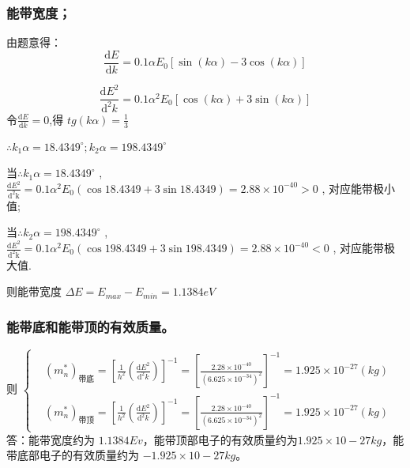 \documentclass[UTF8]{ctexart}   %
\begin{document}
\subsubsection{能带宽度；}

由题意得：
\begin{equation}
    \frac{\mathrm{d}E}{\mathrm{d}k} = 0.1 \alpha E_{0}[ \sin( k \alpha ) -3 \cos( k \alpha ) ]
\end{equation}

\begin{equation}
    \frac{\mathrm{d}E^{2}}{\mathrm{d^{2}}k} = 0.1 \alpha ^{2} E_{0} [ \cos( k \alpha ) + 3 \sin( k \alpha ) ]
\end{equation}
令$ \frac{\mathrm{d} E }{\mathrm{d} k } = 0 $,得 $ tg (k\alpha)= \frac{1}{3} $

$ \therefore k_{1} \alpha = 18.4349 ^{\circ} ; k_{2} \alpha = 198.4349 ^{\circ} $

当$ \therefore k_{1} \alpha = 18.4349 ^{\circ} $ , $ \frac{\mathrm{d} E ^{2} }{\mathrm{d ^{2} k}} = 0.1 \alpha ^{2} E_{0} ( \cos18.4349 + 3 \sin18.4349 ) =2.88 \times 10^{-40} > 0 $ , 对应能带极小值;

当$ \therefore k_{2} \alpha = 198.4349 ^{\circ} $ , $ \frac{\mathrm{d} E ^{2} }{\mathrm{d ^{2} k}} = 0.1 \alpha ^{2} E_{0} ( \cos198.4349 + 3 \sin198.4349 ) =2.88 \times 10^{-40} < 0 $ , 对应能带极大值.

则能带宽度 $ \Delta E = E_{max} - E_{min} = 1.1384 eV $


\subsubsection{能带底和能带顶的有效质量。}

则  
$
    \left\lbrace 
        \begin{aligned}
            & {( m_{n} ^{*})_{\text{带底}} = [ \frac{1}{h^{2}} ( \frac{\mathrm{d} E^{2}}{ \mathrm{d^{2}} k})]^{-1} = [\frac{2.28 \times 10 ^{-40}}{(6.625 \times 10^{-34})^{2}}]^{-1} =1.925 \times 10^{-27} (kg) }  \\
            & {( m_{n} ^{*})_{\text{带顶}} = [ \frac{1}{h^{2}} ( \frac{\mathrm{d} E^{2}}{ \mathrm{d^{2}} k})]^{-1} = [\frac{2.28 \times 10 ^{-40}}{(6.625 \times 10^{-34})^{2}}]^{-1} =1.925 \times 10^{-27} (kg) }
        \end{aligned}
    \right .
$
答：能带宽度约为 $ 1.1384 Ev $，能带顶部电子的有效质量约为$ 1.925 \times 10 - 27 kg $，能带底部电子的有效质量约为 $ - 1.925 \times 10 - 27 kg $。
\end{document}
